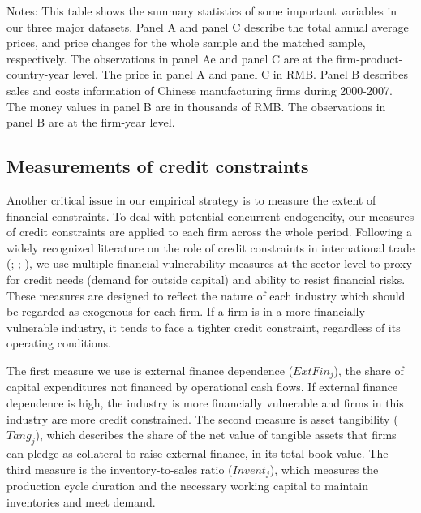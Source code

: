 \documentclass[12pt]{article}
\begin{document}
\begin{table}[htbp]
{\begin{threeparttable}
\begin{tabular}{lcccccc}
		\bottomrule
	\end{tabular}
	\begin{tablenotes}
		\footnotesize
		\item[Notes:] This table shows the summary statistics of some important variables in our three major datasets. Panel A and panel C describe the total annual average prices, and price changes for the whole sample and the matched sample, respectively. The observations in panel Ae and panel C are at the firm-product-country-year level. The price in panel A and panel C in RMB. Panel B describes sales and costs information of Chinese manufacturing firms during 2000-2007. The money values in panel B are in thousands of RMB. The observations in panel B are at the firm-year level.
	\end{tablenotes}
	\end{threeparttable}
        }
\end{table}

\subsection{Measurements of credit constraints} \label{Measurements-Credit Constraints}

Another critical issue in our empirical strategy is to measure the extent of financial constraints. To deal with potential concurrent endogeneity, our measures of credit constraints are applied to each firm across the whole period. Following a widely recognized literature on the role of credit constraints in international trade (\cite{kroszner2007}; \cite{manova-wei-zhang2015}; \cite{fan-lai-li2015}), we use multiple financial vulnerability measures at the sector level to proxy for credit needs (demand for outside capital) and ability to resist financial risks. These measures are designed to reflect the nature of each industry which should be regarded as exogenous for each firm. If a firm is in a more financially vulnerable industry, it tends to face a tighter credit constraint, regardless of its operating conditions.

The first measure we use is external finance dependence ($ExtFin_j$), the share of capital expenditures not financed by operational cash flows. If external finance dependence is high, the industry is more financially vulnerable and firms in this industry are more credit constrained. The second measure is asset tangibility ($Tang_j$), which describes the share of the net value of tangible assets that firms can pledge as collateral to raise external finance, in its total book value. The third measure is the inventory-to-sales ratio ($Invent_j$), which measures the production cycle duration and the necessary working capital to maintain inventories and meet demand. 
\end{document}
